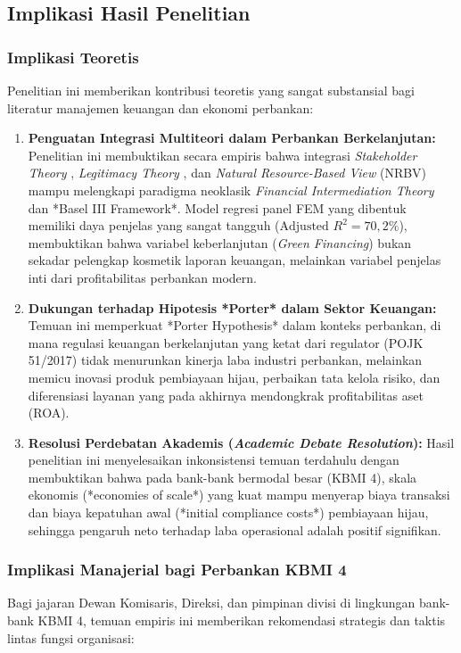 \documentclass[12pt,a4paper]{article}
\numberwithin{equation}{section}
\begin{document}
\subsection{Implikasi Hasil Penelitian}

\subsubsection{Implikasi Teoretis}
\noindent
Penelitian ini memberikan kontribusi teoretis yang sangat substansial bagi literatur manajemen keuangan dan ekonomi perbankan:
\begin{enumerate}
  \item \textbf{Penguatan Integrasi Multiteori dalam Perbankan Berkelanjutan:} Penelitian ini membuktikan secara empiris bahwa integrasi \emph{Stakeholder Theory} \citep{Freeman2010}, \emph{Legitimacy Theory} \citep{Suchman1995}, dan \emph{Natural Resource-Based View} (NRBV) \citep{Hart1995} mampu melengkapi paradigma neoklasik \emph{Financial Intermediation Theory} \citep{Diamond1984} dan *Basel III Framework*. Model regresi panel FEM yang dibentuk memiliki daya penjelas yang sangat tangguh ($\text{Adjusted } R^2 = 70{,}2\%$), membuktikan bahwa variabel keberlanjutan (\emph{Green Financing}) bukan sekadar pelengkap kosmetik laporan keuangan, melainkan variabel penjelas inti dari profitabilitas perbankan modern.
  \item \textbf{Dukungan terhadap Hipotesis *Porter* dalam Sektor Keuangan:} Temuan ini memperkuat *Porter Hypothesis* dalam konteks perbankan, di mana regulasi keuangan berkelanjutan yang ketat dari regulator (POJK 51/2017) tidak menurunkan kinerja laba industri perbankan, melainkan memicu inovasi produk pembiayaan hijau, perbaikan tata kelola risiko, dan diferensiasi layanan yang pada akhirnya mendongkrak profitabilitas aset (ROA).
  \item \textbf{Resolusi Perdebatan Akademis (\emph{Academic Debate Resolution}):} Hasil penelitian ini menyelesaikan inkonsistensi temuan terdahulu dengan membuktikan bahwa pada bank-bank bermodal besar (KBMI 4), skala ekonomis (*economies of scale*) yang kuat mampu menyerap biaya transaksi dan biaya kepatuhan awal (*initial compliance costs*) pembiayaan hijau, sehingga pengaruh neto terhadap laba operasional adalah positif signifikan.
\end{enumerate}

\subsubsection{Implikasi Manajerial bagi Perbankan KBMI 4}
\noindent
Bagi jajaran Dewan Komisaris, Direksi, dan pimpinan divisi di lingkungan bank-bank KBMI 4, temuan empiris ini memberikan rekomendasi strategis dan taktis lintas fungsi organisasi:
\end{document}
